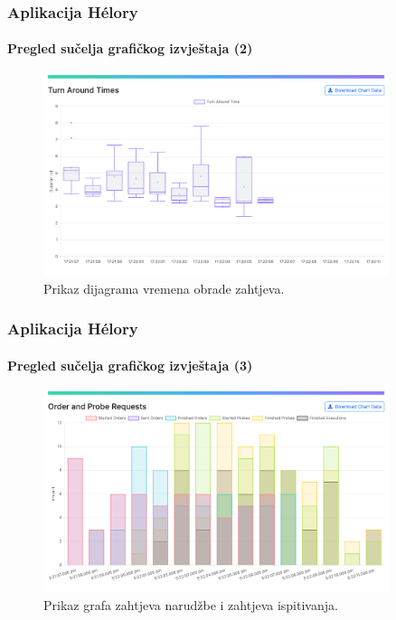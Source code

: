 \documentclass{beamer}
\newif\ifplacelogo
\begin{document}
\placelogofalse
\begin{frame}
\frametitle{Aplikacija Hélory}
\framesubtitle{Pregled sučelja grafičkog izvještaja (2)}
\begin{figure}[htb]
	\centering
	\includegraphics[width=0.9\textwidth]{images/Report UI 2.png}
	\caption{
		Prikaz dijagrama vremena obrade zahtjeva.
	}
\end{figure}
\end{frame}
\placelogotrue

\placelogofalse
\begin{frame}
\frametitle{Aplikacija Hélory}
\framesubtitle{Pregled sučelja grafičkog izvještaja (3)}
\begin{figure}[htb]
	\centering
	\includegraphics[width=0.9\textwidth]{images/Report UI 3.png}
	\caption{
		Prikaz grafa zahtjeva narudžbe i zahtjeva ispitivanja.
	}
\end{figure}
\end{frame}
\placelogotrue
\end{document}
